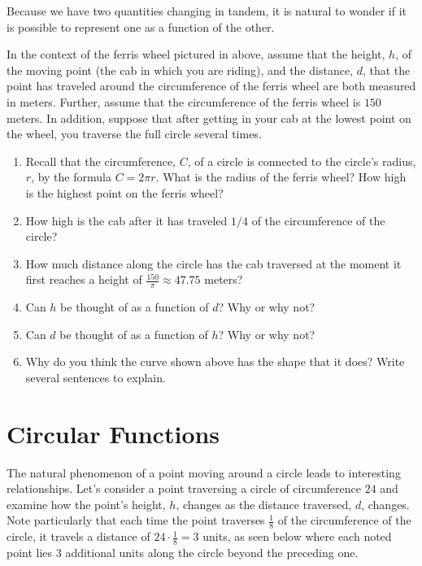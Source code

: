 \documentclass[nooutcomes, noauthor]{ximera}
\begin{document}
Because we have two quantities changing in tandem, it is natural to wonder if it is possible to represent one as a function of the other.%
\begin{exploration}
\hypertarget{p-841}{}%
In the context of the ferris wheel pictured in above, assume that the height, \(h\), of the moving point (the cab in which you are riding), and the distance, \(d\), that the point has traveled around the circumference of the ferris wheel are both measured in meters.  Further, assume that the circumference of the ferris wheel is \(150\) meters.  In addition, suppose that after getting in your cab at the lowest point on the wheel, you traverse the full circle several times.%

\begin{enumerate}[label=\alph*.]
\item
Recall that the circumference, \(C\), of a circle is connected to the circle's radius, \(r\), by the formula \(C = 2\pi r\).  What is the radius of the ferris wheel?  How high is the highest point on the ferris wheel?%
\item
How high is the cab after it has traveled \(1/4\) of the circumference of the circle?%
\item
How much distance along the circle has the cab traversed at the moment it first reaches a height of \(\frac{150}{\pi} \approx 47.75\) meters?%
\item
Can \(h\) be thought of as a function of \(d\)?  Why or why not?%
\item
Can \(d\) be thought of as a function of \(h\)?  Why or why not?%
\item
Why do you think the curve shown above has the shape that it does?  Write several sentences to explain.%
\end{enumerate}

\end{exploration}






\section{Circular Functions}

The natural phenomenon of a point moving around a circle leads to interesting relationships.  Let's consider a point traversing a circle of circumference \(24\) and examine how the point's height, \(h\), changes as the distance traversed, \(d\), changes.  Note particularly that each time the point traverses \(\frac{1}{8}\) of the circumference of the circle, it travels a distance of \(24 \cdot \frac{1}{8} = 3\) units, as seen below where each noted point lies \(3\) additional units along the circle beyond the preceding one.%
\end{document}
